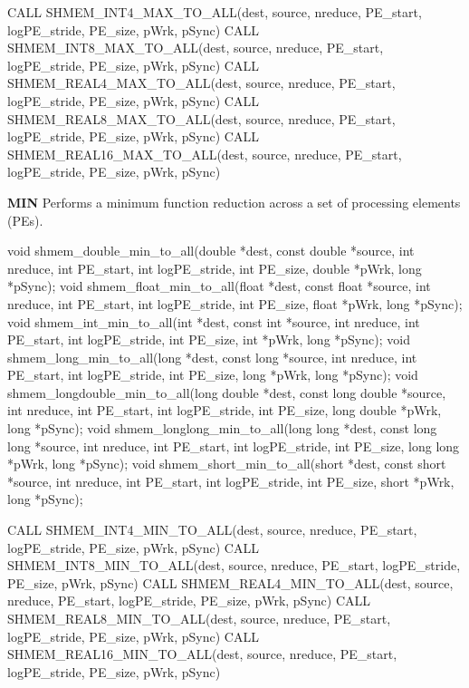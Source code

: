 \begin{apidefinition}
\begin{Fsynopsis}
CALL SHMEM_INT4_MAX_TO_ALL(dest, source, nreduce, PE_start, logPE_stride, PE_size, pWrk, pSync)
CALL SHMEM_INT8_MAX_TO_ALL(dest, source, nreduce, PE_start, logPE_stride, PE_size, pWrk, pSync)
CALL SHMEM_REAL4_MAX_TO_ALL(dest, source, nreduce, PE_start, logPE_stride, PE_size, pWrk, pSync)
CALL SHMEM_REAL8_MAX_TO_ALL(dest, source, nreduce, PE_start, logPE_stride, PE_size, pWrk, pSync)
CALL SHMEM_REAL16_MAX_TO_ALL(dest, source, nreduce, PE_start, logPE_stride, PE_size, pWrk, pSync)
\end{Fsynopsis}

\bigskip
\textbf{MIN} \newline
Performs a minimum function reduction across a set of processing elements (\ac{PE}s).\newline
\begin{Csynopsis}
void shmem_double_min_to_all(double *dest, const double *source, int nreduce, int PE_start, int logPE_stride, int PE_size, double *pWrk, long *pSync);
void shmem_float_min_to_all(float *dest, const float *source, int nreduce, int PE_start, int logPE_stride, int PE_size, float *pWrk, long *pSync);
void shmem_int_min_to_all(int *dest, const int *source, int nreduce, int PE_start, int logPE_stride, int PE_size, int *pWrk, long *pSync);
void shmem_long_min_to_all(long *dest, const long *source, int nreduce, int PE_start, int logPE_stride, int PE_size, long *pWrk, long *pSync);
void shmem_longdouble_min_to_all(long double *dest, const long double *source, int nreduce, int PE_start, int logPE_stride, int PE_size, long double *pWrk, long *pSync);
void shmem_longlong_min_to_all(long long *dest, const long long *source, int nreduce, int PE_start, int logPE_stride, int PE_size, long long *pWrk, long *pSync);
void shmem_short_min_to_all(short *dest, const short *source, int nreduce, int PE_start, int logPE_stride, int PE_size, short *pWrk, long *pSync);
\end{Csynopsis}

\begin{Fsynopsis}
CALL SHMEM_INT4_MIN_TO_ALL(dest, source, nreduce, PE_start, logPE_stride, PE_size, pWrk, pSync)
CALL SHMEM_INT8_MIN_TO_ALL(dest, source, nreduce, PE_start, logPE_stride, PE_size, pWrk, pSync)
CALL SHMEM_REAL4_MIN_TO_ALL(dest, source, nreduce, PE_start, logPE_stride, PE_size, pWrk, pSync)
CALL SHMEM_REAL8_MIN_TO_ALL(dest, source, nreduce, PE_start, logPE_stride, PE_size, pWrk, pSync)
CALL SHMEM_REAL16_MIN_TO_ALL(dest, source, nreduce, PE_start, logPE_stride, PE_size, pWrk, pSync)
\end{Fsynopsis}


\end{apidefinition}
